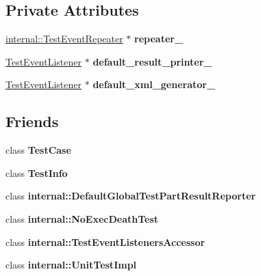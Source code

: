 \subsection*{Private Attributes}
\begin{DoxyCompactItemize}
\item 
\mbox{\label{classtesting_1_1_test_event_listeners_a625d58b951893e80cde12862aece6fd8}} 
\mbox{\hyperlink{classtesting_1_1internal_1_1_test_event_repeater}{internal\+::\+Test\+Event\+Repeater}} $\ast$ {\bfseries repeater\+\_\+}
\item 
\mbox{\label{classtesting_1_1_test_event_listeners_a9ff9ebc31a9a52e5f108661cfcb7ecd9}} 
\mbox{\hyperlink{classtesting_1_1_test_event_listener}{Test\+Event\+Listener}} $\ast$ {\bfseries default\+\_\+result\+\_\+printer\+\_\+}
\item 
\mbox{\label{classtesting_1_1_test_event_listeners_a018a3952aa10c19251b88f27abe373d3}} 
\mbox{\hyperlink{classtesting_1_1_test_event_listener}{Test\+Event\+Listener}} $\ast$ {\bfseries default\+\_\+xml\+\_\+generator\+\_\+}
\end{DoxyCompactItemize}
\subsection*{Friends}
\begin{DoxyCompactItemize}
\item 
\mbox{\label{classtesting_1_1_test_event_listeners_aff779e55b06adfa7c0088bd10253f0f0}} 
class {\bfseries Test\+Case}
\item 
\mbox{\label{classtesting_1_1_test_event_listeners_a4c49c2cdb6c328e6b709b4542f23de3c}} 
class {\bfseries Test\+Info}
\item 
\mbox{\label{classtesting_1_1_test_event_listeners_abae39633da9932847b41cb80efd62115}} 
class {\bfseries internal\+::\+Default\+Global\+Test\+Part\+Result\+Reporter}
\item 
\mbox{\label{classtesting_1_1_test_event_listeners_afddba49fdf3f493532b4d5efb9814f4e}} 
class {\bfseries internal\+::\+No\+Exec\+Death\+Test}
\item 
\mbox{\label{classtesting_1_1_test_event_listeners_addbc107b6b445617c880182bd4f44cf9}} 
class {\bfseries internal\+::\+Test\+Event\+Listeners\+Accessor}
\item 
\mbox{\label{classtesting_1_1_test_event_listeners_acc0a5e7573fd6ae7ad1878613bb86853}} 
class {\bfseries internal\+::\+Unit\+Test\+Impl}
\end{DoxyCompactItemize}


